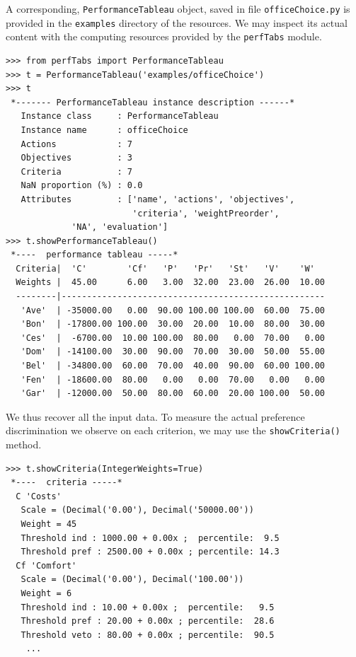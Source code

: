 A corresponding, \texttt{PerformanceTableau} object, saved in file \texttt{officeChoice.py} is provided in the \texttt{examples} directory of the \Digraph resources. We may inspect its actual content with the computing resources provided by the \texttt{perfTabs} module.
\begin{lstlisting}[caption={Inspecting the \texttt{officeChoice} performance tableau},label=list:6.1]
>>> from perfTabs import PerformanceTableau
>>> t = PerformanceTableau('examples/officeChoice')
>>> t
 *------- PerformanceTableau instance description ------*
   Instance class     : PerformanceTableau
   Instance name      : officeChoice
   Actions            : 7
   Objectives         : 3
   Criteria           : 7
   NaN proportion (%) : 0.0
   Attributes         : ['name', 'actions', 'objectives',
                         'criteria', 'weightPreorder',
			 'NA', 'evaluation']
>>> t.showPerformanceTableau()
 *----  performance tableau -----*
  Criteria|  'C'        'Cf'   'P'   'Pr'   'St'   'V'    'W'   
  Weights |  45.00      6.00   3.00  32.00  23.00  26.00  10.00    
  --------|----------------------------------------------------
   'Ave'  | -35000.00   0.00  90.00 100.00 100.00  60.00  75.00  
   'Bon'  | -17800.00 100.00  30.00  20.00  10.00  80.00  30.00  
   'Ces'  |  -6700.00  10.00 100.00  80.00   0.00  70.00   0.00  
   'Dom'  | -14100.00  30.00  90.00  70.00  30.00  50.00  55.00  
   'Bel'  | -34800.00  60.00  70.00  40.00  90.00  60.00 100.00  
   'Fen'  | -18600.00  80.00   0.00   0.00  70.00   0.00   0.00  
   'Gar'  | -12000.00  50.00  80.00  60.00  20.00 100.00  50.00  
\end{lstlisting}

We thus recover all the input data. To measure the actual preference discrimination we observe on each criterion, we may use the \texttt{showCriteria()} method.
\begin{lstlisting}[caption={Inspecting the performance criteria},label=list:6.2]
>>> t.showCriteria(IntegerWeights=True)
 *----  criteria -----*
  C 'Costs'
   Scale = (Decimal('0.00'), Decimal('50000.00'))
   Weight = 45
   Threshold ind : 1000.00 + 0.00x ;  percentile:  9.5
   Threshold pref : 2500.00 + 0.00x ; percentile: 14.3
  Cf 'Comfort'
   Scale = (Decimal('0.00'), Decimal('100.00'))
   Weight = 6
   Threshold ind : 10.00 + 0.00x ;  percentile:   9.5
   Threshold pref : 20.00 + 0.00x ; percentile:  28.6
   Threshold veto : 80.00 + 0.00x ; percentile:  90.5
    ...
\end{lstlisting}

